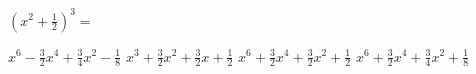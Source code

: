 
\question $(x^2 + \frac{1}{2})^3 = $

  \begin{oneparchoices}
    \choice $x^6 - \frac{3}{2}x^4 + \frac{3}{4}x^2 - \frac{1}{8}$
    \choice $x^3 + \frac{3}{2}x^2 + \frac{3}{2}x + \frac{1}{2}$
    \choice $x^6 + \frac{3}{2}x^4 + \frac{3}{2}x^2 + \frac{1}{2}$
    \CorrectChoice $x^6 + \frac{3}{2}x^4 + \frac{3}{4}x^2 + \frac{1}{8}$
  \end{oneparchoices}
